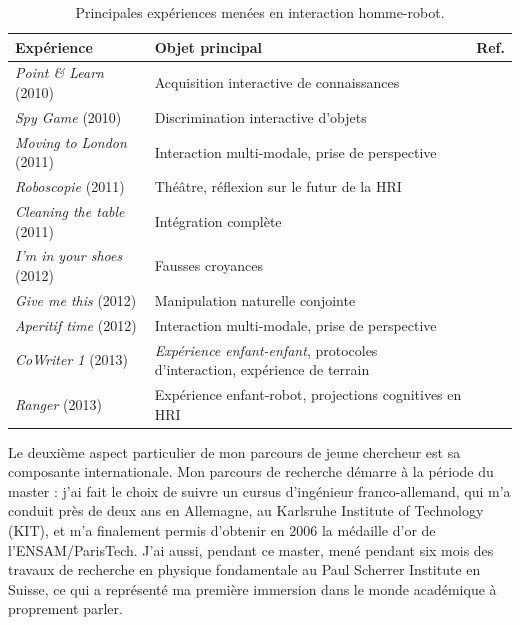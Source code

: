 \documentclass[a4paper]{article}
\begin{document}
\begin{table}
\begin{center}

    \begin{tabular}{lp{6cm}l}
\bf{Expérience} & Objet principal & Ref. \\
\hline
{\it Point \& Learn} (2010) & Acquisition interactive de connaissances & \cite{Lemaignan2010} \\
{\it Spy Game} (2010) & Discrimination interactive d'objets & \cite{ros2010which} \\
{\it Moving to London} (2011) & Interaction multi-modale, \newline prise de perspective & \cite{lemaignan2011what} \\
{\it Roboscopie} (2011) & Théâtre, \newline réflexion sur le futur de la HRI & \cite{lemaignan2012roboscopie} \\
{\it Cleaning the table} (2011) & Intégration complète & \cite{alami2011when} \\
{\it I'm in your shoes} (2012) & Fausses croyances & \cite{Warnier2012a} \\
{\it Give me this} (2012) & Manipulation naturelle conjointe & \cite{gharbi2013natural} \\
{\it Aperitif time} (2012) & Interaction multi-modale, \newline prise de perspective & \cite{lemaignan2013talking} \\
{\it CoWriter 1} (2013) & \emph{Expérience enfant-enfant}, \newline protocoles
d'interaction, expérience de terrain &  \\
{\it Ranger} (2013) & Expérience enfant-robot, \newline projections cognitives en HRI &
\cite{fink2014which, lemaignan2014dynamics} \\
\hline

\end{tabular}
\end{center}
\caption{Principales expériences menées en interaction homme-robot.}
\label{experiences}
\end{table}


Le deuxième aspect particulier de mon parcours de jeune chercheur est sa
composante internationale. Mon parcours de recherche démarre à la période du
master : j'ai fait le choix de suivre un cursus d'ingénieur franco-allemand, qui
m'a conduit près de deux ans en Allemagne, au Karlsruhe Institute of Technology
(KIT), et m'a finalement permis d'obtenir en 2006 la médaille d'or de
l'ENSAM/ParisTech. J'ai aussi, pendant ce master, mené pendant six mois des
travaux de recherche en physique fondamentale au Paul Scherrer Institute en
Suisse, ce qui a représenté ma première immersion dans le monde académique à
proprement parler.
\end{document}
